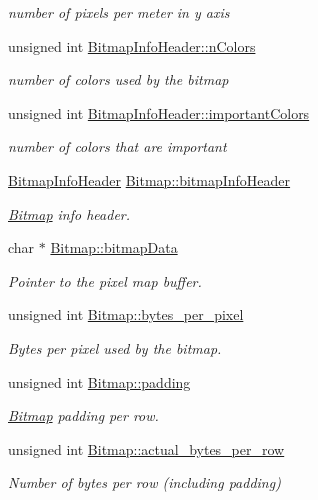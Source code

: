 \begin{DoxyCompactItemize}
\begin{DoxyCompactList}\small\item\em number of pixels per meter in y axis \end{DoxyCompactList}\item 
unsigned int \mbox{\hyperlink{group__bitmap_ga4c543a08d1b72bdda2329b426a213e2a}{Bitmap\+Info\+Header\+::n\+Colors}}
\begin{DoxyCompactList}\small\item\em number of colors used by the bitmap \end{DoxyCompactList}\item 
unsigned int \mbox{\hyperlink{group__bitmap_ga9d87941fcc414085f7361fd89818ee3f}{Bitmap\+Info\+Header\+::important\+Colors}}
\begin{DoxyCompactList}\small\item\em number of colors that are important \end{DoxyCompactList}\item 
\mbox{\hyperlink{struct_bitmap_info_header}{Bitmap\+Info\+Header}} \mbox{\hyperlink{group__bitmap_ga95c481a5ce1ff4af08cd135ca4af120b}{Bitmap\+::bitmap\+Info\+Header}}
\begin{DoxyCompactList}\small\item\em \mbox{\hyperlink{struct_bitmap}{Bitmap}} info header. \end{DoxyCompactList}\item 
char $\ast$ \mbox{\hyperlink{group__bitmap_gad3fa2b9ac8c411719d9c261f41a999f9}{Bitmap\+::bitmap\+Data}}
\begin{DoxyCompactList}\small\item\em Pointer to the pixel map buffer. \end{DoxyCompactList}\item 
unsigned int \mbox{\hyperlink{group__bitmap_gac4487f25d79f268d5bb0580e68e82b53}{Bitmap\+::bytes\+\_\+per\+\_\+pixel}}
\begin{DoxyCompactList}\small\item\em Bytes per pixel used by the bitmap. \end{DoxyCompactList}\item 
unsigned int \mbox{\hyperlink{group__bitmap_ga0ff33a06b37b2b310a499b4ef19fb490}{Bitmap\+::padding}}
\begin{DoxyCompactList}\small\item\em \mbox{\hyperlink{struct_bitmap}{Bitmap}} padding per row. \end{DoxyCompactList}\item 
unsigned int \mbox{\hyperlink{group__bitmap_ga65e6af125468dec1b3b7cf18fad3800f}{Bitmap\+::actual\+\_\+bytes\+\_\+per\+\_\+row}}
\begin{DoxyCompactList}\small\item\em Number of bytes per row (including padding) \end{DoxyCompactList}\end{DoxyCompactItemize}


